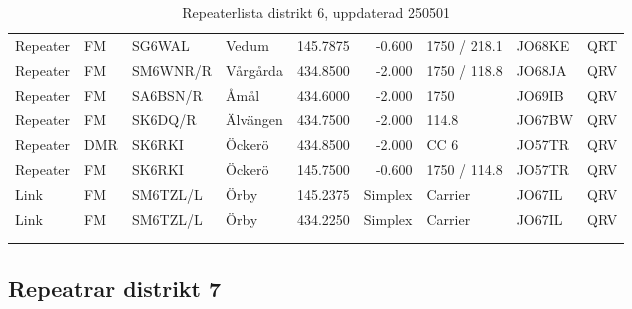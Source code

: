 \begin{longtable}{llllrrlll}
Repeater & FM        & SG6WAL   & Vedum             & 145.7875     & -0.600     & 1750 / 218.1 & JO68KE      & QRT      \\
Repeater & FM        & SM6WNR/R & Vårgårda          & 434.8500     & -2.000     & 1750 / 118.8 & JO68JA      & QRV      \\
Repeater & FM        & SA6BSN/R & Åmål              & 434.6000     & -2.000     & 1750         & JO69IB      & QRV      \\
Repeater & FM        & SK6DQ/R  & Älvängen          & 434.7500     & -2.000     & 114.8        & JO67BW      & QRV      \\
Repeater & DMR       & SK6RKI   & Öckerö            & 434.8500     & -2.000     & CC 6         & JO57TR      & QRV      \\
Repeater & FM        & SK6RKI   & Öckerö            & 145.7500     & -0.600     & 1750 / 114.8 & JO57TR      & QRV      \\
Link     & FM        & SM6TZL/L & Örby              & 145.2375     & Simplex    & Carrier      & JO67IL      & QRV      \\
Link     & FM        & SM6TZL/L & Örby              & 434.2250     & Simplex    & Carrier      & JO67IL      & QRV      \\
\vspace{1 ex}                                                                                                           \\
\caption{Repeaterlista distrikt 6, uppdaterad 250501}                                                                   \\
\end{longtable}

\clearpage

\subsection{Repeatrar distrikt 7}

